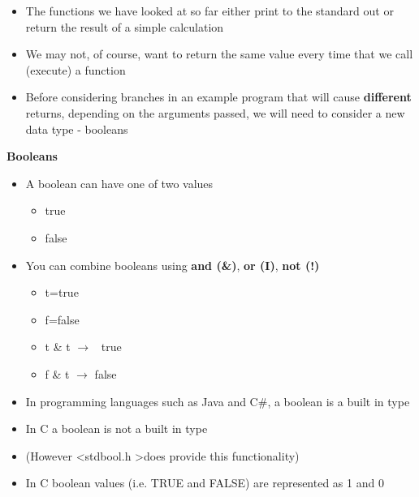 \documentclass{beamer}
\begin{document}
\begin{frame}
\begin{itemize}
\item The functions we have looked at so far either print to the standard out or return the result of a simple calculation
\item We may not, of course, want to return the same value every time that we call (execute) a function
\item Before considering branches in an example program that will cause \textbf{different} returns, depending on the arguments passed, we will need to consider a new data type - booleans
\end{itemize}
\end{frame}

\begin{frame}
\textbf{Booleans}
\begin{itemize}
\item A boolean can have one of two values
\begin{itemize}
\item true
\item false
\end{itemize}
\end{itemize}
\begin{itemize}
\item You can combine booleans using \textbf{and (\&)}, \textbf{or (I)}, \textbf{not (!)}
\begin{itemize}
\item t=true
\item f=false
\item t \& t $\rightarrow $ \ true
\item f \& t $\rightarrow $ false
\end{itemize}
\end{itemize}
\end{frame}

\begin{frame}
\begin{itemize}
\item In programming languages such as Java and C\#, a boolean is a built in type
\item In C a boolean is not a built in type 
\item (However \textless stdbool.h \textgreater does provide this functionality)
\item In C boolean values (i.e. TRUE and FALSE) are represented as 1 and 0
\end{itemize}
\end{frame}
\end{document}
